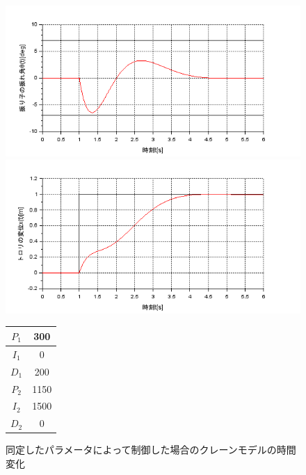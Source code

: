 \documentclass[dvipdfmx,titlepage,a4j]{jsarticle}  %
\begin{document}
\begin{figure}[H]
  \begin{minipage}{4.5cm}
    \centering
    \includegraphics[keepaspectratio, scale=0.35]{../graph/crane/ang-fin-up.png}
  \end{minipage}
  \hfill
  \begin{minipage}{4.5cm}
    \centering
    \includegraphics[keepaspectratio, scale=0.35]{../graph/crane/po-fin-up.png}
  \end{minipage}
  \hfill
  \begin{minipage}{3cm}
      \begin{center}
        \begin{tabular}{c|c}
          \hline
          $P_1$ & 300\\ \hline
          $I_1$ & 0\\ \hline
          $D_1$ & 200\\ \hline
          $P_2$ & 1150\\ \hline
          $I_2$ & 1500\\ \hline
          $D_2$ & 0\\
          \hline
        \end{tabular}
      \end{center}
  \end{minipage}
  \hfill
  \caption{同定したパラメータによって制御した場合のクレーンモデルの時間変化}
  \label{fig:crane:fin-up}
\end{figure}
\end{document}
